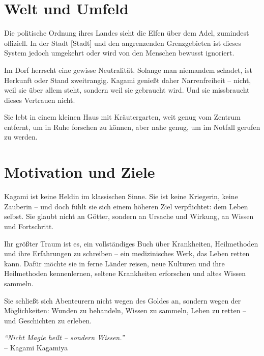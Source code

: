 \documentclass[12pt,a4paper]{article}
\begin{document}
\newpage

\section{Welt und Umfeld}

Die politische Ordnung ihres Landes sieht die Elfen über dem Adel, zumindest offiziell. In der Stadt [Stadt] und den angrenzenden Grenzgebieten ist dieses System jedoch umgekehrt oder wird von den Menschen bewusst ignoriert.

Im Dorf herrscht eine gewisse Neutralität. Solange man niemandem schadet, ist Herkunft oder Stand zweitrangig. Kagami genießt daher Narrenfreiheit – nicht, weil sie über allem steht, sondern weil sie gebraucht wird. Und sie missbraucht dieses Vertrauen nicht.

Sie lebt in einem kleinen Haus mit Kräutergarten, weit genug vom Zentrum entfernt, um in Ruhe forschen zu können, aber nahe genug, um im Notfall gerufen zu werden.

\newpage

\section{Motivation und Ziele}

Kagami ist keine Heldin im klassischen Sinne. Sie ist keine Kriegerin, keine Zauberin – und doch fühlt sie sich einem höheren Ziel verpflichtet: dem Leben selbst. Sie glaubt nicht an Götter, sondern an Ursache und Wirkung, an Wissen und Fortschritt.

Ihr größter Traum ist es, ein vollständiges Buch über Krankheiten, Heilmethoden und ihre Erfahrungen zu schreiben – ein medizinisches Werk, das Leben retten kann. Dafür möchte sie in ferne Länder reisen, neue Kulturen und ihre Heilmethoden kennenlernen, seltene Krankheiten erforschen und altes Wissen sammeln.

Sie schließt sich Abenteurern nicht wegen des Goldes an, sondern wegen der Möglichkeiten: Wunden zu behandeln, Wissen zu sammeln, Leben zu retten – und Geschichten zu erleben.

\newpage

\vfill

\begin{center}
    \textit{“Nicht Magie heilt – sondern Wissen.”} \\
    -- Kagami Kagamiya
\end{center}
\end{document}
